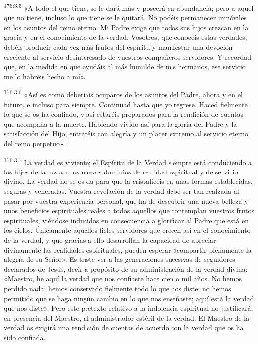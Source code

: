 \par 
\textsuperscript{176:3.5} «A todo el que tiene, se le dará más y poseerá en abundancia; pero a aquel que no tiene, incluso lo que tiene se le quitará. No podéis permanecer inmóviles en los asuntos del reino eterno. Mi Padre exige que todos sus hijos crezcan en la gracia y en el conocimiento de la verdad. Vosotros, que conocéis estas verdades, debéis producir cada vez más frutos del espíritu y manifestar una devoción creciente al servicio desinteresado de vuestros compañeros servidores. Y recordad que, en la medida en que ayudáis al más humilde de mis hermanos, ese servicio me lo habréis hecho a mí».

\par 
\textsuperscript{176:3.6} «Así es como deberíais ocuparos de los asuntos del Padre, ahora y en el futuro, e incluso para siempre. Continuad hasta que yo regrese. Haced fielmente lo que se os ha confiado, y así estaréis preparados para la rendición de cuentas que acompaña a la muerte. Habiendo vivido así para la gloria del Padre y la satisfacción del Hijo, entraréis con alegría y un placer extremo al servicio eterno del reino perpetuo».

\par 
\textsuperscript{176:3.7} La verdad es viviente; el Espíritu de la Verdad siempre está conduciendo a los hijos de la luz a unos nuevos dominios de realidad espiritual y de servicio divino. La verdad no se os da para que la cristalicéis en unas formas establecidas, seguras y veneradas. Vuestra revelación de la verdad debe ser tan realzada al pasar por vuestra experiencia personal, que ha de descubrir una nueva belleza y unos beneficios espirituales reales a todos aquellos que contemplan vuestros frutos espirituales, viéndose inducidos en consecuencia a glorificar al Padre que está en los cielos. Únicamente aquellos fieles servidores que crecen así en el conocimiento de la verdad, y que gracias a ello desarrollan la capacidad de apreciar divinamente las realidades espirituales, pueden esperar «compartir plenamente la alegría de su Señor». Es triste ver a las generaciones sucesivas de seguidores declarados de Jesús, decir a propósito de su administración de la verdad divina: «Maestro, he aquí la verdad que nos confiaste hace cien o mil años. No hemos perdido nada; hemos conservado fielmente todo lo que nos diste; no hemos permitido que se haga ningún cambio en lo que nos enseñaste; aquí está la verdad que nos diste». Pero este pretexto relativo a la indolencia espiritual no justificará, en presencia del Maestro, al administrador estéril de la verdad. El Maestro de la verdad os exigirá una rendición de cuentas de acuerdo con la verdad que os ha sido confiada.

